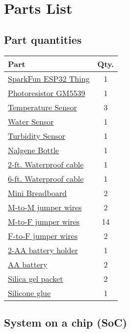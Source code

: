 \section{Parts List}

\subsection{Part quantities}

\begin{tabular}{|l|c|}
    \hline
    \textbf{Part} & \textbf{Qty.}\\
    \hline
    \hyperlink{esp32}{SparkFun ESP32 Thing} & 1\\
    \hline
    \hyperlink{light}{Photoresistor GM5539} & 1\\
    \hline
    \hyperlink{temp}{Temperature Sensor} & 3\\
    \hline
    \hyperlink{salinity}{Water Sensor} & 1\\
    \hline
    \hyperlink{turbidity}{Turbidity Sensor} & 1\\
    \hline
    \hyperlink{nalgene}{Nalgene Bottle} & 1\\
    \hline
    \hyperlink{cable}{2-ft. Waterproof cable} & 1\\
    \hline
    \hyperlink{cable}{6-ft. Waterproof cable} & 1\\
    \hline
    \hyperlink{minibread}{Mini Breadboard} & 2\\
    \hline
    \hyperlink{jumperwires}{M-to-M jumper wires} & 2\\
    \hline
    \hyperlink{jumperwires}{M-to-F jumper wires} & 14\\
    \hline
    \hyperlink{jumperwires}{F-to-F jumper wires} & 2\\
    \hline
    \hyperlink{batteryholder}{2-AA battery holder} & 1\\
    \hline
    \hyperlink{battery}{AA battery} & 2\\
    \hline
    \hyperlink{silica}{Silica gel packet} & 2\\
    \hline
    \hyperlink{glue}{Silicone glue} & 1\\
    \hline

\end{tabular}

\subsection{System on a chip (SoC)}

